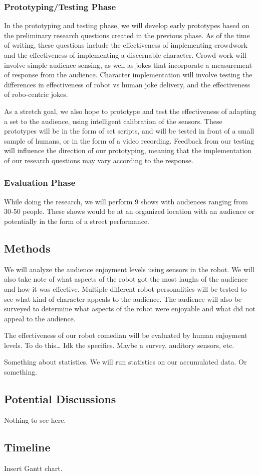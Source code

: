 \documentclass[onecolumn, draftclsnofoot,10pt, compsoc]{IEEEtran}
\begin{document}
\subsubsection{Prototyping/Testing Phase}
In the prototyping and testing phase, we will develop early prototypes based on the preliminary research questions created in the previous phase. As of the time of writing, these questions include the effectiveness of implementing crowdwork and the effectiveness of implementing a discernable character. Crowd-work will involve simple audience sensing, as well as jokes that incorporate a measurement of response from the audience. Character implementation will involve testing the differences in effectiveness of robot vs human joke delivery, and the effectiveness of robo-centric jokes.

As a stretch goal, we also hope to prototype and test the effectiveness of adapting a set to the audience, using intelligent calibration of the sensors. These prototypes will be in the form of set scripts, and will be tested in front of a small sample of humans, or in the form of a video recording. Feedback from our testing will influence the direction of our prototyping, meaning that the implementation of our research questions may vary according to the response.

\subsubsection{Evaluation Phase}
While doing the research, we will perform 9 shows with audiences ranging from 30-50 people. These shows would be at an organized location with an audience or potentially in the form of a street performance.

\subsection{Methods}
We will analyze the audience enjoyment levels using sensors in the robot. We will also take note of what aspects of the robot got the most laughs of the audience and how it was effective. Multiple different robot personalities will be tested to see what kind of character appeals to the audience. The audience will also be surveyed to determine what aspects of the robot were enjoyable and what did not appeal to the audience.

The effectiveness of our robot comedian will be evaluated by human enjoyment levels. To do this… Idk the specifics. Maybe a survey, auditory sensors, etc.

Something about statistics. We will run statistics on our accumulated data. Or something.


\subsection{Potential Discussions}

Nothing to see here.

\subsection{Timeline}

Insert Gantt chart.


% 
% 
\end{document}
